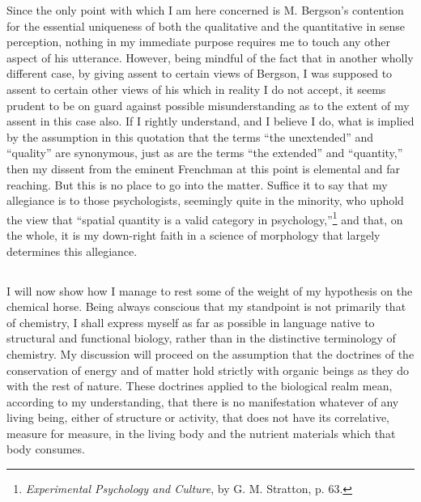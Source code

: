 \documentclass[a4paper, 11pt, oneside, polutonikogreek, english, landscape]{article}
\begin{document}
Since the only point with which I am here concerned is M. Bergson's contention for the essential uniqueness of both the qualitative and the quantitative in sense perception, nothing in my immediate purpose requires me to touch any other aspect of his utterance. However, being mindful of the fact that in another wholly different case, by giving assent to certain views of Bergson, I was supposed to assent to certain other views of his which in reality I do not accept, it seems prudent to be on guard against possible misunderstanding as to the extent of my assent in this case also. If I rightly understand, and I believe I do, what is implied by the assumption in this quotation that the terms ``the unextended'' and ``quality'' are synonymous, just as are the terms ``the extended'' and ``quantity,'' then my dissent from the eminent Frenchman at this point is elemental and far reaching. But this is no place to go into the matter. Suffice it to say that my allegiance is to those psychologists, seemingly quite in the minority, who uphold the view that ``spatial quantity is a valid category in psychology,''\footnote{\emph{Experimental Psychology and Culture}, by G. M. Stratton, p. 63.} and that, on the whole, it is my down-right faith in a science of morphology that largely determines this allegiance.

\subsection{}
\paragraph{}
I will now show how I manage to rest some of the weight of my hypothesis on the chemical horse. Being always conscious that my standpoint is not primarily that of chemistry, I shall express myself as far as possible in language native to structural and functional biology, rather than in the distinctive terminology of chemistry. My discussion will proceed on the assumption that the doctrines of the conservation of energy and of matter hold strictly with organic beings as they do with the rest of nature. These doctrines applied to the biological realm mean, according to my understanding, that there is no manifestation whatever of any living being, either of structure or activity, that does not have its correlative, measure for measure, in the living body and the nutrient materials which that body consumes.
\end{document}
